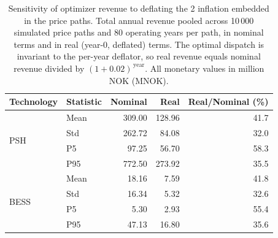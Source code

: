 \begin{table}[ht]
\centering
\caption{Sensitivity of optimizer revenue to deflating the 2%
inflation embedded in the price paths. Total annual revenue pooled across
10\,000 simulated price paths and 80 operating years per path, in nominal terms
and in real (year-0, deflated) terms. The optimal dispatch is invariant to the
per-year deflator, so real revenue equals nominal revenue divided by
$(1+0.02)^{\,\text{year}}$. All monetary values in million NOK (MNOK).}
\label{tab:opt-sensitivity-real}
\begin{tabular}{llrrr}
\toprule
Technology & Statistic & Nominal & Real & Real/Nominal (\%) \\
\midrule
  \multirow{4}{*}{PSH} & Mean & 309.00 & 128.96 & 41.7 \\
   & Std & 262.72 & 84.08 & 32.0 \\
   & P5 & 97.25 & 56.70 & 58.3 \\
   & P95 & 772.50 & 273.92 & 35.5 \\
  \midrule
  \multirow{4}{*}{BESS} & Mean & 18.16 & 7.59 & 41.8 \\
   & Std & 16.34 & 5.32 & 32.6 \\
   & P5 & 5.30 & 2.93 & 55.4 \\
   & P95 & 47.13 & 16.80 & 35.6 \\
\bottomrule
\end{tabular}
\end{table}
